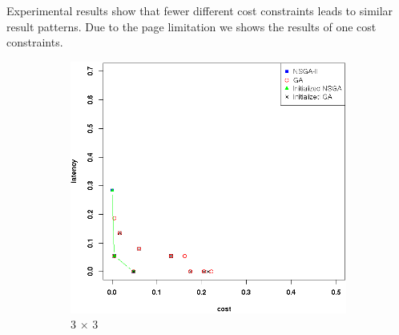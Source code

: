 \documentclass{llncs}
\begin{document}
\begin{flushleft}
\begin{flushleft}
Experimental results show that fewer different cost constraints leads to similar result patterns. Due to the page limitation we shows the results of one cost constraints.




\begin{figure}[H]
	\centering
	\begin{subfigure}[b]{0.4\textwidth}
		\includegraphics[width=\textwidth]{pics/pop_50_gen_50_3_times_3_sufficient_initialisation.png}
		\caption{3 $\times$ 3}
	\end{subfigure}%
	\begin{subfigure}[b]{0.4\textwidth}

\end{subfigure}
\end{figure}
\end{flushleft}
\end{flushleft}
\end{document}
